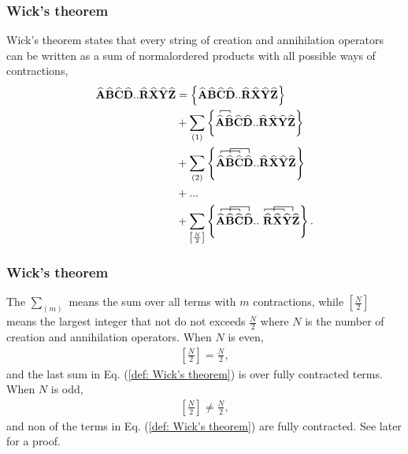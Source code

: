\documentclass[compress]{beamer}
\newcommand*{\kpr}[1]{\left\{#1\right\}}
\newcommand{\OP}[1]{{\bf\widehat{#1}}}
\newcommand*{\fpr}[1]{\left[#1\right]}
\newcommand*{\pr}[1]{\left(#1\right)}
\begin{document}
\frame
{
  \frametitle{Wick's theorem}
\begin{small}
{\scriptsize
Wick's theorem states that every string of creation and annihilation operators can be written as a sum of normalordered products with all possible ways of contractions,
\begin{align}
\label{def: Wick's theorem}
\OP{A}\OP{B}\OP{C}\OP{D}..\OP{R}\OP{X}\OP{Y}\OP{Z} &= \kpr{\OP{A}\OP{B}\OP{C}\OP{D}..\OP{R}\OP{X}\OP{Y}\OP{Z}}\\
&+ \sum_{\pr{1}} \kpr{ 
\contraction[0.5ex]{}{\OP{A}}{}{\OP{B}} \OP{A}\OP{B}\OP{C}\OP{D}..\OP{R}\OP{X}\OP{Y}\OP{Z}}\\
&+ \sum_{\pr{2}} \kpr{\contraction[0.5ex]{}{\OP{A}}{\OP{B}}{\OP{C}}\contraction[1.0ex]{\OP{A}}{\OP{B}}{\OP{C}}{\OP{D}}\OP{A}\OP{B}\OP{C}\OP{D}..\OP{R}\OP{X}\OP{Y}\OP{Z}}\\
&+ ...\\
&+ \sum_{\fpr{\frac{N}{2}}}\kpr{\contraction[0.5ex]{}{\OP{A}}{\OP{B}}{\OP{C}}\contraction[1.0ex]{\OP{A}}{\OP{B}}{\OP{C}}{\OP{D}} \OP{A}\OP{B}\OP{C}\OP{D}..\contraction[0.5ex]{}{\OP{R}}{\OP{X}}{\OP{Y}}\contraction[1.0ex]{\OP{R}}{\OP{X}}{\OP{Y}}{\OP{Z}}\ \OP{R}\OP{X}\OP{Y}\OP{Z}}.
\end{align}
}
\end{small}
}

\frame
{
  \frametitle{Wick's theorem}
\begin{small}
{\scriptsize
The $\sum_{\pr{m}}$ means the sum over all terms with $m$ contractions, while $\fpr{\frac{N}{2}}$ means the largest integer that not do not exceeds $\frac{N}{2}$ where $N$ is the number of creation and annihilation operators. When $N$ is even, 
\begin{align}
\label{exp: Wick condition}
\fpr{\frac{N}{2}} = \frac{N}{2},
\end{align}
and the last sum in Eq. (\ref{def: Wick's theorem}) is over fully contracted terms. When $N$ is odd,
\begin{align}
\fpr{\frac{N}{2}} \neq \frac{N}{2},
\end{align}
and non of the terms in Eq. (\ref{def: Wick's theorem}) are fully contracted. See later for a proof. 
}
\end{small}
}
\end{document}
